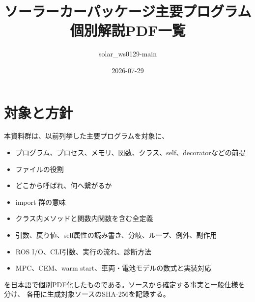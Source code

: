 \documentclass[a4paper,11pt]{article}
\title{ソーラーカーパッケージ主要プログラム\\個別解説PDF一覧}
\author{solar\_ws0129-main}
\date{2026-07-29}
\begin{document}
        \maketitle

        \section*{対象と方針}
        本資料群は、以前列挙した主要プログラムを対象に、
        \begin{itemize}[leftmargin=1.6em]
          \item プログラム、プロセス、メモリ、関数、クラス、self、decoratorなどの前提
          \item ファイルの役割
          \item どこから呼ばれ、何へ繋がるか
          \item import 群の意味
          \item クラス内メソッドと関数内関数を含む全定義
          \item 引数、戻り値、self属性の読み書き、分岐、ループ、例外、副作用
          \item ROS I/O、CLI引数、実行の流れ、診断方法
          \item MPC、CEM、warm start、車両・電池モデルの数式と実装対応
        \end{itemize}
        を日本語で個別PDF化したものである。ソースから確定する事実と一般仕様を分け、
        各冊に生成対象ソースのSHA-256を記録する。
\end{document}
